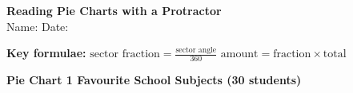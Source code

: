 \documentclass[a4paper,12pt]{article}
\begin{document}
\begin{center}
  {\LARGE\bfseries Reading Pie Charts with a Protractor}\\[4pt]
  \vspace{2em}
  {Name:\;\underline{\hspace{6cm}} \quad
   Date:\;\underline{\hspace{2.8cm}}}
\end{center}
\vspace{4pt}


\begin{mdframed}[backgroundcolor=boxgreen, linecolor=slice3,
                 linewidth=1.5pt, roundcorner=6pt, innertopmargin=6pt]
\textbf{Key formulae:}\quad
$\displaystyle\text{sector fraction} = \frac{\text{sector angle}}{360}$
\qquad\qquad
$\displaystyle\text{amount} = \text{fraction} \times \text{total}$
\end{mdframed}
\vspace{8pt}

\begin{center}
  {\large\bfseries Pie Chart 1 \textendash{} Favourite School Subjects (30 students)}
\end{center}
\end{document}

